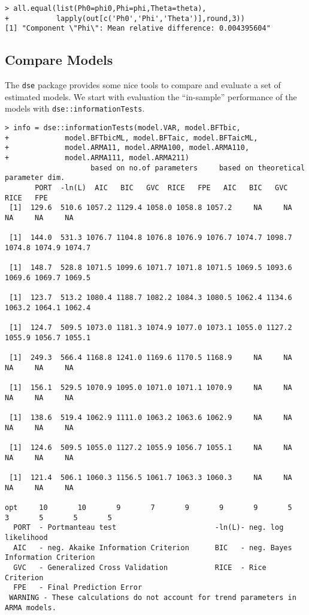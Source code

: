 \documentclass[]{article}
\begin{document}
\begin{verbatim}
> all.equal(list(Ph0=phi0,Phi=phi,Theta=theta), 
+           lapply(out[c('Ph0','Phi','Theta')],round,3))
[1] "Component \"Phi\": Mean relative difference: 0.004395604"
\end{verbatim}

\subsection{Compare Models}\label{compare-models}

The \texttt{dse} package provides some nice tools to compare and
evaluate a set of estimated models. We start with evaluation the
``in-sample'' performance of the models with
\texttt{dse::informationTests}.

\begin{verbatim}
> info = dse::informationTests(model.VAR, model.BFTbic, 
+             model.BFTbicML, model.BFTaic, model.BFTaicML, 
+             model.ARMA11, model.ARMA100, model.ARMA110, 
+             model.ARMA111, model.ARMA211)
                    based on no.of parameters     based on theoretical parameter dim. 
       PORT  -ln(L)  AIC   BIC   GVC  RICE   FPE   AIC   BIC   GVC   RICE   FPE
 [1]  129.6  510.6 1057.2 1129.4 1058.0 1058.8 1057.2     NA     NA     NA     NA     NA

 [1]  144.0  531.3 1076.7 1104.8 1076.8 1076.9 1076.7 1074.7 1098.7 1074.8 1074.9 1074.7

 [1]  148.7  528.8 1071.5 1099.6 1071.7 1071.8 1071.5 1069.5 1093.6 1069.6 1069.7 1069.5

 [1]  123.7  513.2 1080.4 1188.7 1082.2 1084.3 1080.5 1062.4 1134.6 1063.2 1064.1 1062.4

 [1]  124.7  509.5 1073.0 1181.3 1074.9 1077.0 1073.1 1055.0 1127.2 1055.9 1056.7 1055.1

 [1]  249.3  566.4 1168.8 1241.0 1169.6 1170.5 1168.9     NA     NA     NA     NA     NA

 [1]  156.1  529.5 1070.9 1095.0 1071.0 1071.1 1070.9     NA     NA     NA     NA     NA

 [1]  138.6  519.4 1062.9 1111.0 1063.2 1063.6 1062.9     NA     NA     NA     NA     NA

 [1]  124.6  509.5 1055.0 1127.2 1055.9 1056.7 1055.1     NA     NA     NA     NA     NA

 [1]  121.4  506.1 1060.3 1156.5 1061.7 1063.3 1060.3     NA     NA     NA     NA     NA

opt     10       10       9       7       9       9       9       5       3       5       5       5       
  PORT  - Portmanteau test                       -ln(L)- neg. log likelihood                  
  AIC   - neg. Akaike Information Criterion      BIC   - neg. Bayes  Information Criterion    
  GVC   - Generalized Cross Validation           RICE  - Rice Criterion                       
  FPE   - Final Prediction Error               
 WARNING - These calculations do not account for trend parameters in ARMA models.
\end{verbatim}
\end{document}
